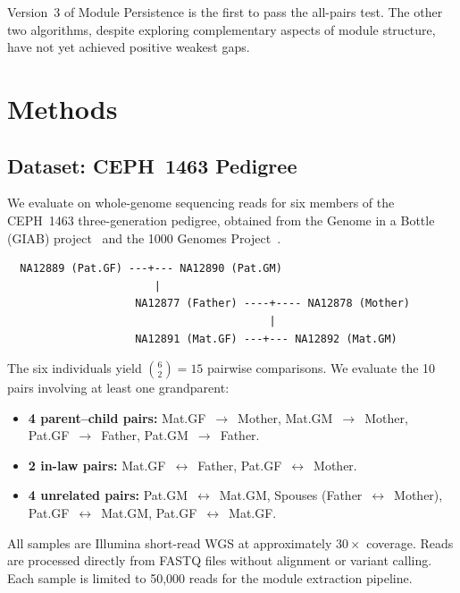 \documentclass{../yalumba}
\begin{document}
Version~3 of Module Persistence is the first to pass the all-pairs test.
The other two algorithms, despite exploring complementary aspects of module
structure, have not yet achieved positive weakest gaps.


\section{Methods}
\label{sec:methods}

\subsection{Dataset: CEPH~1463 Pedigree}

We evaluate on whole-genome sequencing reads for six members of the CEPH~1463
three-generation pedigree, obtained from the Genome in a Bottle (GIAB)
project~\cite{zook2019giab} and the 1000 Genomes
Project~\cite{1000genomes2015}.

\begin{pedigree}
\begin{verbatim}
  NA12889 (Pat.GF) ---+--- NA12890 (Pat.GM)
                       |
                    NA12877 (Father) ----+---- NA12878 (Mother)
                                         |
                    NA12891 (Mat.GF) ---+--- NA12892 (Mat.GM)
\end{verbatim}
\end{pedigree}


\noindent The six individuals yield $\binom{6}{2} = 15$ pairwise comparisons.
We evaluate the 10 pairs involving at least one grandparent:

\begin{itemize}
  \item \textbf{4 parent--child pairs:}  Mat.GF~$\to$~Mother,
        Mat.GM~$\to$~Mother, Pat.GF~$\to$~Father, Pat.GM~$\to$~Father.
  \item \textbf{2 in-law pairs:}  Mat.GF~$\leftrightarrow$~Father,
        Pat.GF~$\leftrightarrow$~Mother.
  \item \textbf{4 unrelated pairs:}  Pat.GM~$\leftrightarrow$~Mat.GM,
        Spouses (Father~$\leftrightarrow$~Mother),
        Pat.GF~$\leftrightarrow$~Mat.GM,
        Pat.GF~$\leftrightarrow$~Mat.GF.
\end{itemize}

All samples are Illumina short-read WGS at approximately $30\times$ coverage.
Reads are processed directly from FASTQ files without alignment or variant
calling.  Each sample is limited to 50{,}000 reads for the module extraction
pipeline.
\end{document}
